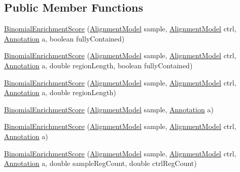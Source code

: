 \subsection*{Public Member Functions}
\begin{DoxyCompactItemize}
\item 
\hyperlink{classumms_1_1core_1_1model_1_1score_1_1_binomial_enrichment_score_a6c32742ec3585fee33ce18af66f22d1f}{Binomial\+Enrichment\+Score} (\hyperlink{classumms_1_1core_1_1model_1_1_alignment_model}{Alignment\+Model} sample, \hyperlink{classumms_1_1core_1_1model_1_1_alignment_model}{Alignment\+Model} ctrl, \hyperlink{interfaceumms_1_1core_1_1annotation_1_1_annotation}{Annotation} a, boolean fully\+Contained)
\item 
\hyperlink{classumms_1_1core_1_1model_1_1score_1_1_binomial_enrichment_score_ac287d61a0ed83ca8c32c1e552daab472}{Binomial\+Enrichment\+Score} (\hyperlink{classumms_1_1core_1_1model_1_1_alignment_model}{Alignment\+Model} sample, \hyperlink{classumms_1_1core_1_1model_1_1_alignment_model}{Alignment\+Model} ctrl, \hyperlink{interfaceumms_1_1core_1_1annotation_1_1_annotation}{Annotation} a, double region\+Length, boolean fully\+Contained)
\item 
\hyperlink{classumms_1_1core_1_1model_1_1score_1_1_binomial_enrichment_score_a077cd2dcb03a88cc6639780f327985f3}{Binomial\+Enrichment\+Score} (\hyperlink{classumms_1_1core_1_1model_1_1_alignment_model}{Alignment\+Model} sample, \hyperlink{classumms_1_1core_1_1model_1_1_alignment_model}{Alignment\+Model} ctrl, \hyperlink{interfaceumms_1_1core_1_1annotation_1_1_annotation}{Annotation} a, double region\+Length)
\item 
\hyperlink{classumms_1_1core_1_1model_1_1score_1_1_binomial_enrichment_score_ac3e0d5a14d133ed231c40778dfb1eed9}{Binomial\+Enrichment\+Score} (\hyperlink{classumms_1_1core_1_1model_1_1_alignment_model}{Alignment\+Model} sample, \hyperlink{interfaceumms_1_1core_1_1annotation_1_1_annotation}{Annotation} a)
\item 
\hyperlink{classumms_1_1core_1_1model_1_1score_1_1_binomial_enrichment_score_aa76ada6537232562511cc7ebeebd4dd0}{Binomial\+Enrichment\+Score} (\hyperlink{classumms_1_1core_1_1model_1_1_alignment_model}{Alignment\+Model} sample, \hyperlink{classumms_1_1core_1_1model_1_1_alignment_model}{Alignment\+Model} ctrl, \hyperlink{interfaceumms_1_1core_1_1annotation_1_1_annotation}{Annotation} a)
\item 
\hyperlink{classumms_1_1core_1_1model_1_1score_1_1_binomial_enrichment_score_a165eca4b162bee7c58ef312b9a7f5271}{Binomial\+Enrichment\+Score} (\hyperlink{classumms_1_1core_1_1model_1_1_alignment_model}{Alignment\+Model} sample, \hyperlink{classumms_1_1core_1_1model_1_1_alignment_model}{Alignment\+Model} ctrl, \hyperlink{interfaceumms_1_1core_1_1annotation_1_1_annotation}{Annotation} a, double sample\+Reg\+Count, double ctrl\+Reg\+Count)

\end{DoxyCompactItemize}
